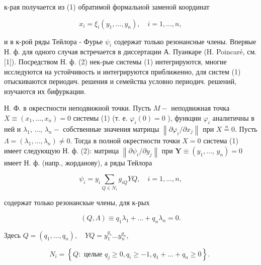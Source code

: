 \documentclass[10pt]{article}
\begin{document}
к-рая получается из (1) обратимой формальной заменой координат



\[

x_{i}=\xi_{i}\left(y_{1}, \ldots, y_{n}\right), \quad i=1, \ldots, n,

\]



и в к-рой ряды Тейлора - Фурье $\psi_{i}$ содержат только резонансные члены. Впервые Н. ф. для одного случая встречается в диссертации А. Пуанкаре (H. Poincaré, см. [1]). Посредством Н. ф. (2) нек-рые системы (1) интегрируются, многие исследуются на устойчивость и интегрируются приближенно, для систем (1) отыскиваются периодич. решения и семейства условно периодич. решений, изучаются их бифуркации.



Н. Ф. в окрестности неподвижной точки. Пусть $M-$ неподвижная точка $X \equiv\left(x_{1}, \ldots, x_{n}\right)=0$ системы (1) (т. е. $\varphi_{i}(0)=0$ ), функции $\varphi_{i}$ аналитичны в ней и $\lambda_{1}$, ..., $\lambda_{n}-$ собственные значения матрицы $\left\|\partial \varphi_{i} / \partial x_{j}\right\|$ при $X \stackrel{n}{=} 0$. Пусть $\Lambda=\left(\lambda_{1}, \ldots, \lambda_{n}\right) \neq 0$. Тогда в полной окрестности точки $X=0$ система (1) имеет следующую Н. ф. (2): матрица $\left\|\partial \psi_{i} / \partial y_{j}\right\|$ при $\boldsymbol{Y} \equiv\left(y_{1}, \ldots\right.$, $\left.y_{n}\right)=0$ имеет Н. ф. (напр., жорданову), а ряды Тейлора



\[

\psi_{i}=y_{i} \sum_{Q \in N_{i}} g_{i Q} Y Q, \quad i=1, \ldots, n,

\]



содержат только резонанскые члены, для к-рых



\[

(Q, \Lambda) \equiv q_{1} \lambda_{1}+\ldots+q_{n} \lambda_{n}=0 .

\]



Здесь $Q=\left(q_{1}, \ldots, q_{n}\right), \quad Y Q=y_{1}^{q_{1}} \ldots y_{n}^{q_{n}}$,



\[

N_{i}=\left\{Q: \text { целые } q_{j} \geqslant 0, q_{i} \geqslant-1, q_{1}+\ldots+q_{n} \geqslant 0\right\} \text {. }

\]
\end{document}

